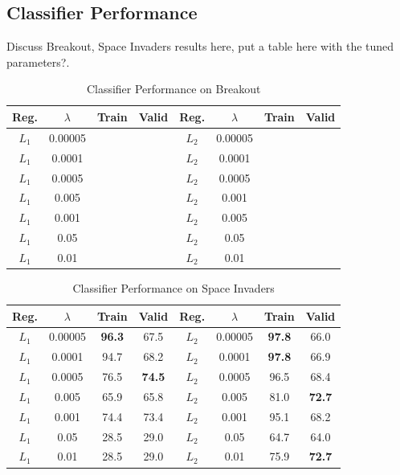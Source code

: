 \documentclass[letterpaper, 10pt, conference]{ieeeconf}
\begin{document}
\subsection{Classifier Performance}

Discuss Breakout, Space Invaders results here, put a table here with the tuned
parameters?.

\begin{table}[!t]
\renewcommand{\arraystretch}{1.3}
\caption{Classifier Performance on Breakout}
\label{tab:breakout}
\centering
\begin{tabular}{c c c c | c c c c}
\hline
Reg.  & $\lambda$ & Train & Valid & Reg.  & $\lambda$ & Train & Valid \\
\hline
$L_1$ & 0.00005   &   &   & $L_2$ & 0.00005   &   &  \\
$L_1$ & 0.0001    &   &   & $L_2$ & 0.0001    &   &  \\
$L_1$ & 0.0005    &   &   & $L_2$ & 0.0005    &   &  \\
$L_1$ & 0.005     &   &   & $L_2$ & 0.001     &   &  \\
$L_1$ & 0.001     &   &   & $L_2$ & 0.005     &   &  \\
$L_1$ & 0.05      &   &   & $L_2$ & 0.05      &   &  \\
$L_1$ & 0.01      &   &   & $L_2$ & 0.01      &   &  \\
\hline
\end{tabular}
\end{table}

\begin{table}[!t]
\renewcommand{\arraystretch}{1.3}
\caption{Classifier Performance on Space Invaders}
\label{tab:space_invaders}
\centering
\begin{tabular}{c c c c | c c c c}
\hline
Reg.  & $\lambda$ & Train & Valid & Reg.  & $\lambda$ & Train & Valid \\
\hline
$L_1$ & 0.00005   & \textbf{96.3}  & 67.5  & $L_2$ & 0.00005   & \textbf{97.8}  & 66.0 \\
$L_1$ & 0.0001    & 94.7  & 68.2  & $L_2$ & 0.0001    & \textbf{97.8}  & 66.9 \\
$L_1$ & 0.0005    & 76.5  & \textbf{74.5}  & $L_2$ & 0.0005    & 96.5  & 68.4 \\
$L_1$ & 0.005     & 65.9  & 65.8  & $L_2$ & 0.005     & 81.0  & \textbf{72.7} \\
$L_1$ & 0.001     & 74.4  & 73.4  & $L_2$ & 0.001     & 95.1  & 68.2 \\
$L_1$ & 0.05      & 28.5  & 29.0  & $L_2$ & 0.05      & 64.7  & 64.0 \\
$L_1$ & 0.01      & 28.5  & 29.0  & $L_2$ & 0.01      & 75.9  & \textbf{72.7} \\
\hline
\end{tabular}
\end{table}
\end{document}
